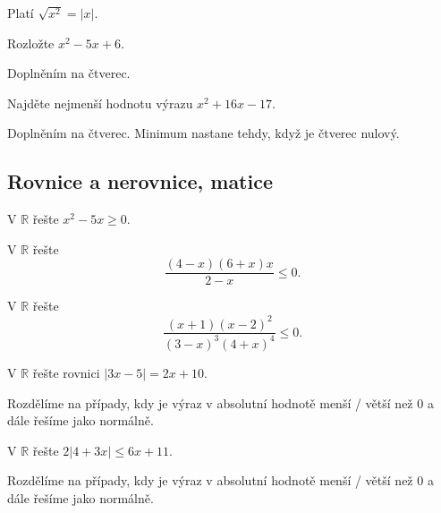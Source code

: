 \begin{reseni}
Platí $\sqrt{x^2}=|x| $.
\end{reseni}

\begin{priklad}
Rozložte $x^2-5x+6$.
\end{priklad}

\begin{reseni}
Doplněním na čtverec.
\end{reseni}

\begin{priklad}
Najděte nejmenší hodnotu výrazu $x^2+16x-17.$
\end{priklad}

\begin{reseni}
Doplněním na čtverec. Minimum nastane tehdy, když je čtverec nulový.
\end{reseni}


\subsection{Rovnice a nerovnice, matice}
\begin{priklad}
    V $\mathbb R$ řešte $x^2-5x \geq 0.$
\end{priklad}

\begin{priklad}
V $\mathbb R$ řešte
$$\frac{(4-x)(6+x)x}{2-x}\leq 0.$$
\end{priklad}

\begin{priklad}
V $\mathbb R$ řešte $$\frac{(x+1)(x-2)^2}{(3-x)^3(4+x)^4}\leq 0.$$
\end{priklad}

\begin{priklad}
V $\mathbb R$ řešte rovnici $|3x-5|=2x+10.$
\end{priklad}

\begin{priklad}
Rozdělíme na případy, kdy je výraz v absolutní hodnotě menší / větší než 0
a dále řešíme jako normálně.
\end{priklad}

\begin{priklad}
V $\mathbb R$ řešte $2|4+3x|\leq 6x+11.$
\end{priklad}

\begin{reseni}
Rozdělíme na případy, kdy je výraz v absolutní hodnotě menší / větší než 0
a dále řešíme jako normálně.
\end{reseni}

